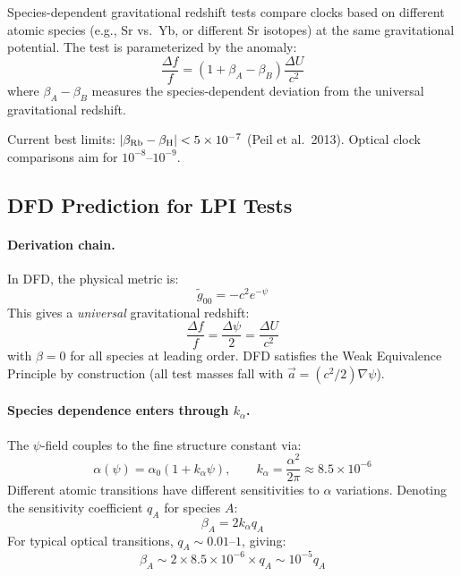 \documentclass[11pt]{article}
\begin{document}
Species-dependent gravitational redshift tests compare clocks based on
different atomic species (e.g., Sr vs.\ Yb, or different Sr isotopes)
at the same gravitational potential. The test is parameterized by the
anomaly:
\begin{equation}
\frac{\Delta f}{f} = (1 + \beta_A - \beta_B) \frac{\Delta U}{c^2}
\end{equation}
where $\beta_A - \beta_B$ measures the species-dependent deviation from
the universal gravitational redshift.

Current best limits: $|\beta_{\rm Rb} - \beta_{\rm H}| <
5 \times 10^{-7}$ (Peil et al.\ 2013). Optical clock comparisons aim
for $10^{-8}$--$10^{-9}$.

\subsection{DFD Prediction for LPI Tests}

\paragraph{Derivation chain.}
In DFD, the physical metric is:
\begin{equation}
\tilde{g}_{00} = -c^2 e^{-\psi}
\end{equation}
This gives a \emph{universal} gravitational redshift:
\begin{equation}
\frac{\Delta f}{f} = \frac{\Delta\psi}{2} = \frac{\Delta U}{c^2}
\end{equation}
with $\beta = 0$ for all species at leading order. DFD satisfies the
Weak Equivalence Principle by construction (all test masses fall with
$\vec{a} = (c^2/2)\nabla\psi$).

\paragraph{Species dependence enters through $k_\alpha$.}
The $\psi$-field couples to the fine structure constant via:
\begin{equation}
\alpha(\psi) = \alpha_0(1 + k_\alpha \psi), \qquad
k_\alpha = \frac{\alpha^2}{2\pi} \approx 8.5 \times 10^{-6}
\end{equation}
Different atomic transitions have different sensitivities to $\alpha$
variations. Denoting the sensitivity coefficient $q_A$ for species $A$:
\begin{equation}
\beta_A = 2 k_\alpha q_A
\end{equation}
For typical optical transitions, $q_A \sim 0.01$--$1$, giving:
\begin{equation}
\beta_A \sim 2 \times 8.5 \times 10^{-6} \times q_A
\sim 10^{-5} q_A
\end{equation}
\end{document}
